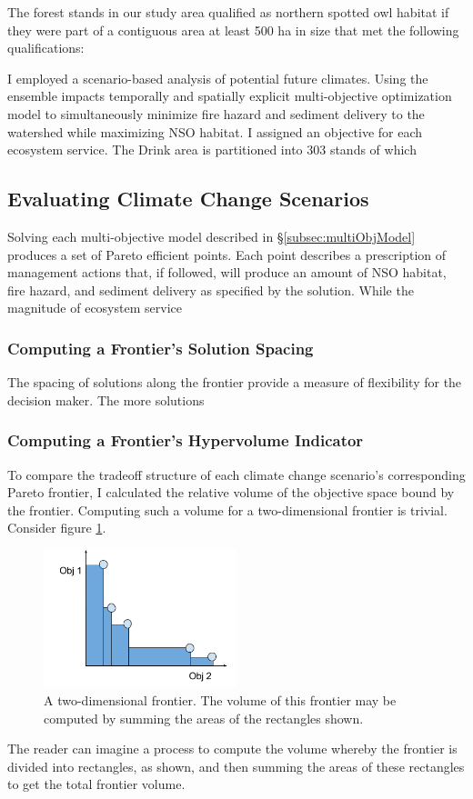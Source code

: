 The forest stands in our study area qualified as northern spotted owl habitat if they were part of a contiguous area at least 500 ha in size that met the following qualifications: 

 I employed a scenario-based analysis of potential future climates. Using the ensemble  impacts temporally and spatially explicit multi-objective optimization model to simultaneously minimize fire hazard and sediment delivery to the watershed while maximizing NSO habitat. I assigned an objective for each ecosystem service. The Drink area is partitioned into 303 stands of which 

\subsection{Evaluating Climate Change Scenarios}
Solving each multi-objective model described in \S \ref{subsec:multiObjModel} produces a set of Pareto efficient points. Each point describes a prescription of management actions that, if followed, will produce an amount of NSO habitat, fire hazard, and sediment delivery as specified by the solution. While the magnitude of ecosystem service 

\subsubsection{Computing a Frontier's Solution Spacing}
The spacing of solutions along the frontier provide a measure of flexibility for the decision maker. The more solutions 

\subsubsection{Computing a Frontier's Hypervolume Indicator}
To compare the tradeoff structure of each climate change scenario's corresponding Pareto frontier, I calculated the relative volume of the objective space bound by the frontier.  Computing such a volume for a two-dimensional frontier is trivial. Consider figure \ref{fig:2DFrontierVol}.
\begin{figure}[h]
  \centering
    \includegraphics[width=0.5\textwidth]{"../images/2DFrontierVolumeExample"}
  \caption{A two-dimensional frontier. The volume of this frontier may be computed by summing the areas of the rectangles shown.}
  \label{fig:2DFrontierVol}
\end{figure}
The reader can imagine a process to compute the volume whereby the frontier is divided into rectangles, as shown, and then summing the areas of these rectangles to get the total frontier volume.

